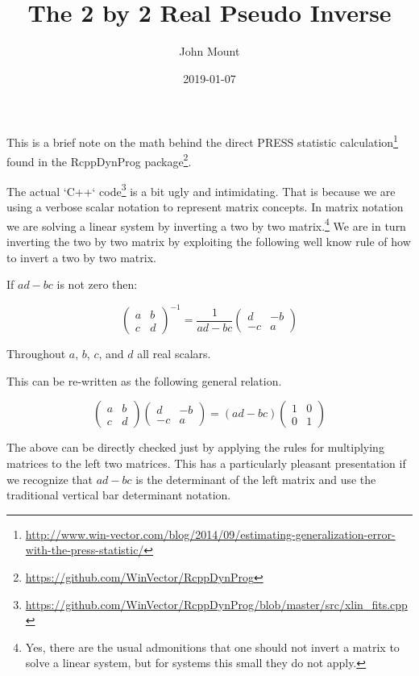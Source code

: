 \documentclass{article}
\begin{document}
\title{The 2 by 2 Real Pseudo Inverse}
\author{John Mount}
\date{2019-01-07}




\maketitle


This is a brief note on the math behind the direct
PRESS statistic calculation\footnote{\url{http://www.win-vector.com/blog/2014/09/estimating-generalization-error-with-the-press-statistic/}} 
found in the RcppDynProg package\footnote{\url{https://github.com/WinVector/RcppDynProg}}.

The actual `C++` code\footnote{\url{https://github.com/WinVector/RcppDynProg/blob/master/src/xlin_fits.cpp}} is a bit ugly and intimidating.  That is because we are using a verbose scalar notation to represent matrix concepts.  In matrix notation we are solving a linear system by inverting a two by two matrix.\footnote{Yes, there are the usual admonitions that one should not invert a matrix to solve a linear system, but for systems this small they do not apply.}  We are in turn inverting the two by two matrix by exploiting the following well know rule of how to invert a two by two matrix.


If $a d - b c$ is not zero then:

\[ 
\begin{pmatrix} a & b \\ c & d \end{pmatrix}^{-1}
=
\frac{1}{a d - b c}
\begin{pmatrix} d & -b \\ -c & a \end{pmatrix}
\]

Throughout $a$, $b$, $c$, and $d$ all real scalars.

This can be re-written as the following general relation.

\[ 
\begin{pmatrix} a & b \\ c & d \end{pmatrix}
\begin{pmatrix} d & -b \\ -c & a \end{pmatrix}
=
(a d - b c) 
\begin{pmatrix} 1 & 0 \\ 0 & 1 \end{pmatrix}
\]

The above can be directly checked just by applying the rules for multiplying matrices to the left two matrices.  This has a particularly pleasant presentation if we recognize that $a d - b c$ is  the determinant of the left matrix and use the traditional vertical bar determinant notation.
\end{document}
